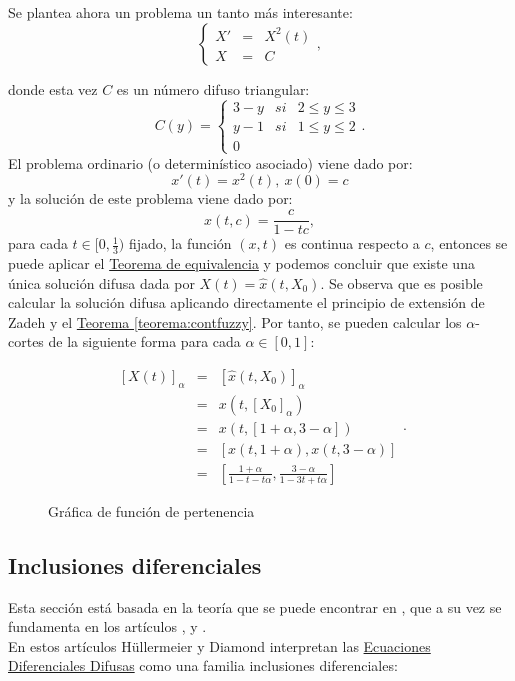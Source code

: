 \begin{ejemplo}
	Se plantea ahora un problema un tanto más interesante:
	\[
		\left\{
			\begin{array}{ccc}
				X' & = & X^2(t) \\
				X & =  & C
			\end{array}
		\right.,
	\]
	
	donde esta vez $C$ es un número difuso triangular:
	\[
		C(y) = \left\{
			\begin{array}{ccc}
				3 - y & si & 2 \leq y \leq 3 \\
				y - 1 & si & 1 \leq y \leq 2 \\
				0 
			\end{array}
		\right. .
	\]
	El problema ordinario (o determinístico asociado) viene dado por:
	\[
		x'(t) = x^2(t), ~ x(0) = c
	\]
	y la solución de este problema viene dado por:
	\[
		x(t, c) = \frac{c}{1-tc},
	\]
	para cada $t \in [0, \frac{1}{3})$ fijado, la función $(x, t)$ es continua respecto a $c$, entonces se puede aplicar el \hyperref[teorema:equivalencia]{Teorema de equivalencia} y podemos concluir que existe una única solución difusa dada por $X(t) = \hat{x}(t, X_0)$. Se observa que es posible calcular la solución difusa aplicando directamente el principio de extensión de Zadeh y el \hyperref[teorema:contfuzzy]{Teorema \ref*{teorema:contfuzzy}}. Por tanto, se pueden calcular los $\alpha$-cortes de la siguiente forma para cada $\alpha \in [0, 1]$:
	
	\[
		\begin{array}{ccc}
			[X(t)]_\alpha & = & [\hat{x}(t, X_0)]_\alpha \\
			& = & x(t, [X_0]_\alpha) \\
			& = & x(t, [1+\alpha, 3-\alpha]) \\
			& = & [x(t, 1+\alpha), x(t, 3-\alpha)] \\
			& = & \left[
				\frac{1+\alpha}{1-t-t\alpha}, \frac{3-\alpha}{1-3t + t\alpha}
			\right]
		\end{array}.
	\]
	
    \begin{figure}[h]
	\centering
		\caption{Gráfica de función de pertenencia}
		\label{fig:solucion_difusa}
	\end{figure}
\end{ejemplo}

\subsection{Inclusiones diferenciales}
Esta sección está basada en la teoría que se puede encontrar en \cite{fuzzyintro}, que a su vez se fundamenta en los artículos  \cite{inclusionesdif1}, \cite{inclusionesdif2} y \cite{inclusionesdif3}.\\
En estos artículos Hüllermeier y Diamond interpretan las  \hyperref[def:edf]{Ecuaciones Diferenciales Difusas} como una familia inclusiones diferenciales:

